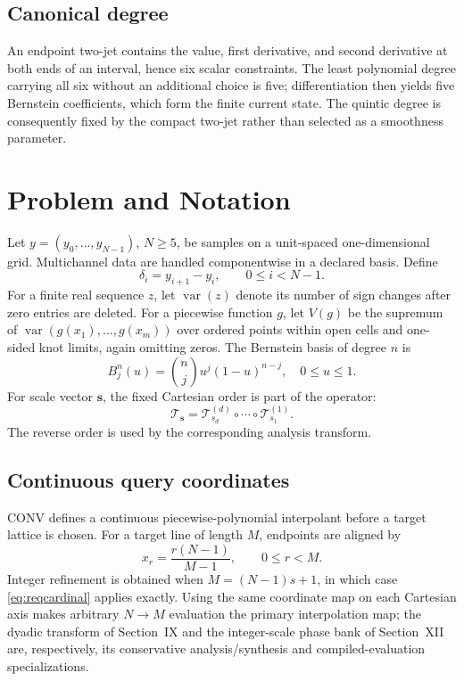 \documentclass[journal]{IEEEtran}
\newcommand{\Tcal}{\mathcal{T}}
\newcommand{\var}{\operatorname{var}}
\begin{document}
\subsection{Canonical degree}

An endpoint two-jet contains the value, first derivative, and second
derivative at both ends of an interval, hence six scalar constraints. The
least polynomial degree carrying all six without an additional choice is
five; differentiation then yields five Bernstein coefficients, which form
the finite current state. The quintic degree is consequently fixed by the
compact two-jet rather than selected as a smoothness parameter.

\section{Problem and Notation}

Let \(y=(y_0,\ldots,y_{N-1})\), \(N\geq5\), be samples on a unit-spaced
one-dimensional grid. Multichannel data are handled componentwise in a
declared basis. Define
\begin{equation}
  \delta_i=y_{i+1}-y_i,\qquad 0\leq i<N-1.
  \label{eq:secant}
\end{equation}
For a finite real sequence \(z\), let \(\var(z)\) denote its number of sign
changes after zero entries are deleted. For a piecewise function \(g\), let
\(V(g)\) be the supremum of \(\var(g(x_1),\ldots,g(x_m))\) over ordered
points within open cells and one-sided knot limits, again omitting zeros.
The Bernstein basis of degree \(n\) is
\begin{equation}
  B_j^n(u)=\binom{n}{j}u^j(1-u)^{n-j},\quad 0\leq u\leq1.
  \label{eq:bernstein}
\end{equation}
For scale vector \(\bm s\), the fixed Cartesian order is part of the
operator:
\begin{equation}
  \Tcal_{\bm s}
  =\Tcal_{s_d}^{(d)}\circ\cdots\circ\Tcal_{s_1}^{(1)}.
  \label{eq:product}
\end{equation}
The reverse order is used by the corresponding analysis transform.

\subsection{Continuous query coordinates}

CONV defines a continuous piecewise-polynomial interpolant before a target
lattice is chosen. For a target line of length \(M\), endpoints are aligned
by
\begin{equation}
 x_r=\frac{r(N-1)}{M-1},\qquad 0\leq r<M.
 \label{eq:targetmap}
\end{equation}
Integer refinement is obtained when \(M=(N-1)s+1\), in which case
\eqref{eq:reqcardinal} applies exactly. Using the same coordinate map on each
Cartesian axis makes arbitrary \(N\to M\) evaluation the primary
interpolation map; the dyadic transform of Section~IX and the integer-scale
phase bank of Section~XII are, respectively, its conservative
analysis/synthesis and compiled-evaluation specializations.
\end{document}
